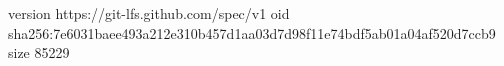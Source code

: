 version https://git-lfs.github.com/spec/v1
oid sha256:7e6031baee493a212e310b457d1aa03d7d98f11e74bdf5ab01a04af520d7ccb9
size 85229
